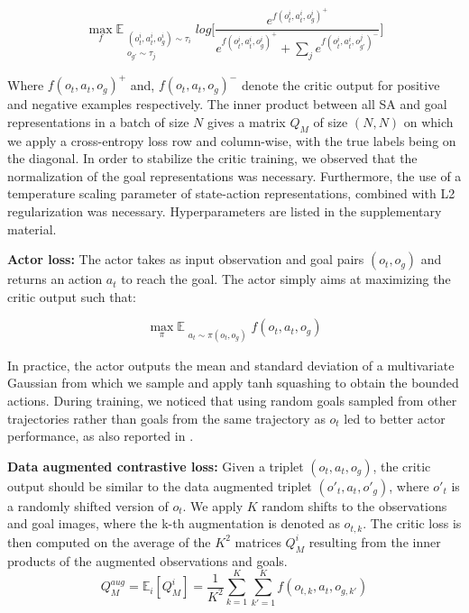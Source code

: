 \begin{equation}
    \max_{f} \mathbb{E}_{\substack{(o_t^i, a_t^i, o_g^i) \sim \tau_i \\ o_{g'} \sim \tau_j }} log\big[\frac{e^{f(o_t^i, a_t^i, o_g^i)^+}}{e^{f(o_t^i, a_t^i, o_g^i)^+} + \sum_j e^{f(o_t^i, a_t^i, o_{g'}^j)^-}}\big]
    \label{eq:critic_loss}
\end{equation}

Where $f(o_t, a_t, o_g)^+$ and, $f(o_t, a_t, o_g)^-$ denote the critic output for positive and negative examples respectively. The inner product between all SA and goal representations in a batch of size $N$ gives a matrix $Q_M$ of size $(N, N)$ on which we apply a cross-entropy loss row and column-wise, with the true labels being on the diagonal. In order to stabilize the critic training, we observed that the normalization of the goal representations was necessary. Furthermore, the use of a temperature scaling parameter of state-action representations, combined with L2 regularization was necessary. Hyperparameters are listed in the supplementary material.

\textbf{Actor loss:} The actor takes as input observation and goal pairs $(o_t, o_g)$ and returns an action $a_t$ to reach the goal. The actor simply aims at maximizing the critic output such that:

\begin{equation}
    \max_{\pi} \mathbb{E}_{\substack{ a_t \sim \pi(o_t, o_g)}} f(o_t, a_t, o_g)
    \label{eq:actor_loss}
\end{equation}

In practice, the actor outputs the mean and standard deviation of a multivariate Gaussian from which we sample and apply tanh squashing to obtain the bounded actions.
During training, we noticed that using random goals sampled from other trajectories rather than goals from the same trajectory as $o_t$ led to better actor performance, as also reported in \cite{Eysenbach2022ContrastiveLA}.

\textbf{Data augmented contrastive loss:} Given a triplet $(o_t, a_t, o_g)$, the critic output should be similar to the data augmented triplet $(o'_t, a_t, o'_g)$, where $o'_t$ is a randomly shifted version of $o_t$. We apply $K$ random shifts to the observations and goal images, where the k-th augmentation is denoted as $o_{t,k}$. The critic loss is then computed on the average of the $K^2$ matrices $Q_M^i$ resulting from the inner products of the augmented observations and goals.
\begin{equation}
    Q_M^{aug} = \mathbb{E}_i[Q^i_M] = \frac{1}{K^2} \sum_{k=1}^K \sum_{k'=1}^K f(o_{t,k}, a_t, o_{g,k'})
    \label{eq:data_aug_loss}
\end{equation}

